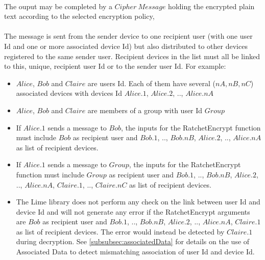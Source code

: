 \documentclass[a4paper,11pt]{article}
\begin{document}
      \paragraph{}The ouput may be completed by a $Cipher\ Message$ holding the encrypted plain text according to the selected encryption policy,
      \paragraph{}The message is sent from the sender device to one recipient user (with one user Id and one or more associated device Id) but also distributed to other devices registered to the same sender user. Recipient devices in the list must all be linked to this, unique, recipient user Id or to the sender user Id. For example:
      \begin{itemize}
        \item $Alice$, $Bob$ and $Claire$ are users Id. Each of them have several ($nA, nB, nC$) associated devices with devices Id $Alice.1$, $Alice.2$, .., $Alice.nA$
        \item $Alice$, $Bob$ and $Claire$ are members of a group with user Id $Group$
        \item If $Alice.1$ sends a message to $Bob$, the inputs for the RatchetEncrypt function must include $Bob$ as recipient user and $Bob.1$, .., $Bob.nB$, $Alice.2$, .., $Alice.nA$ as list of recipient devices.
        \item If $Alice.1$ sends a message to $Group$, the inputs for the RatchetEncrypt function must include $Group$ as recipient user and $Bob.1$, .., $Bob.nB$, $Alice.2$, .., $Alice.nA$, $Claire.1$, .., $Claire.nC$ as list of recipient devices.
        \item The Lime library does not perform any check on the link between user Id and device Id and will not generate any error if the RatchetEncrypt arguments are $Bob$ as recipient user and $Bob.1$, .., $Bob.nB$, $Alice.2$, .., $Alice.nA$, $Claire.1$ as list of recipient devices. The error would instead be detected by $Claire.1$ during decryption. See \ref{subsubsec:associatedData} for details on the use of Associated Data to detect mismatching association of user Id and device Id.
      \end{itemize}
\end{document}
